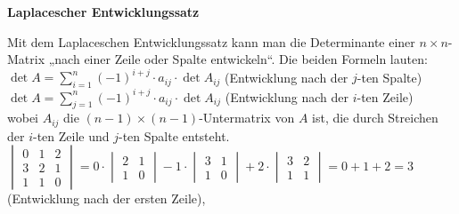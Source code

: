 \textbf{Laplacescher Entwicklungssatz}

Mit dem Laplaceschen Entwicklungssatz kann man die Determinante einer $n \times n$-Matrix „nach einer Zeile oder Spalte entwickeln“. Die beiden Formeln lauten:\\
$\det A = \sum_{i=1}^n (-1)^{i+j} \cdot a_{ij} \cdot \det A_{ij}$ (Entwicklung nach der $j$-ten Spalte)\\
$\det A = \sum_{j=1}^n (-1)^{i+j} \cdot a_{ij} \cdot \det A_{ij}$ (Entwicklung nach der $i$-ten Zeile)\\
wobei $A_{ij}$ die $(n-1) \times (n-1)$-Untermatrix von $A$ ist, die durch Streichen der $i$-ten Zeile und $j$-ten Spalte entsteht.
$
 \begin{vmatrix}
 0 & 1 & 2 \\
 3 & 2 & 1 \\
 1 & 1 & 0
 \end{vmatrix}
 =
 0 \cdot
 \begin{vmatrix}
 2 & 1 \\
 1 & 0
 \end{vmatrix}
 -1 \cdot
 \begin{vmatrix}
 3 & 1 \\
 1 & 0
 \end{vmatrix}
 +2 \cdot
 \begin{vmatrix}
 3 & 2 \\
 1 & 1
 \end{vmatrix}
 = 0 + 1 + 2
 = 3
$
(Entwicklung nach der ersten Zeile),

